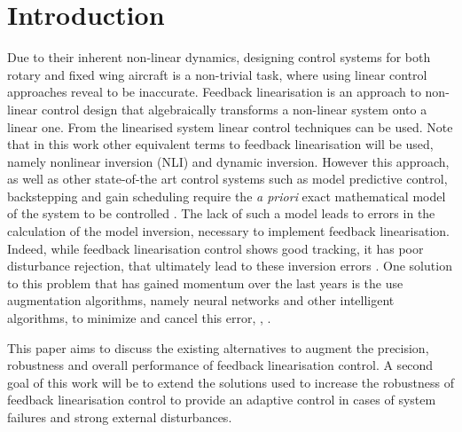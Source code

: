 
\chapter{Introduction}
\label{chapter:introduction}

Due to their inherent non-linear dynamics, designing control systems for both rotary and fixed wing aircraft is a non-trivial task, where using linear control approaches reveal to be inaccurate. Feedback linearisation is an approach to non-linear control design that algebraically transforms a non-linear system onto a linear one. From the linearised system linear control techniques can be used. Note that in this work other equivalent terms to feedback linearisation will be used, namely nonlinear inversion (NLI) and dynamic inversion. 
However this approach, as well as other state-of-the art control systems such as model predictive control, backstepping and gain scheduling require the \textit{a priori} exact mathematical model of the system to be controlled \cite{SotA_IFCS}. The lack of such a model leads to errors in the calculation of the model inversion, necessary to implement feedback linearisation. Indeed, while feedback linearisation control shows good tracking, it has poor disturbance rejection, that ultimately lead to these inversion errors \cite{SotA_ControlAlgorithm}. One solution to this problem that has gained momentum over the last years is the use augmentation algorithms, namely neural networks and other intelligent algorithms, to minimize and cancel this error\cite{NLI+NN}, \cite{NLI+NN_IFCS}, \cite{NLI+NN_chinese}. 

This paper aims to discuss the existing alternatives to augment the precision, robustness and overall performance of feedback linearisation control. A second goal of this work will be to extend the solutions used to increase the robustness of feedback linearisation control to provide an adaptive control in cases of system failures and strong external disturbances.



